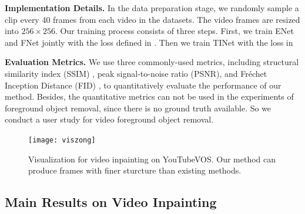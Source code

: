  

\noindent \textbf{Implementation Details.} 
In the data preparation stage, we randomly sample a clip every 40 frames from each video in the datasets.
The video frames are resized into $256\times256$.
%
Our training process consists of three steps.
First, we train ENet and FNet jointly with the loss defined in .
Then we train TINet with the loss in 


  

\noindent \textbf{Evaluation Metrics.} 
We use three commonly-used metrics, including structural similarity index (SSIM) \cite{wang2004image}, peak signal-to-noise ratio (PSNR), and Fr{\'e}chet Inception Distance (FID) \cite{heusel2017gans}, to quantitatively evaluate the performance of our method. 
%
Besides, the quantitative metrics can not be used in the experiments of foreground object removal, since there is no ground truth available. 
So we conduct a user study for video foreground object removal. 
 



\begin{figure}[t]
	\centering
	\texttt{[image: viszong]} %
	\caption{Visualization for video inpainting on YouTubeVOS. Our method can produce frames with finer sturcture than existing methods. }
	\label{viszong}
\end{figure}


\subsection{Main Results on Video Inpainting}

